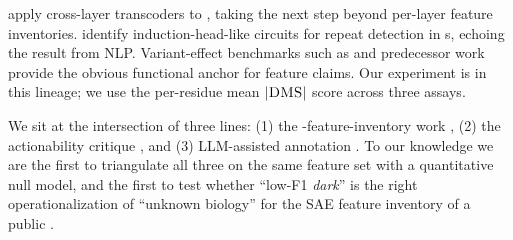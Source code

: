  \citet{circuit2026tracing} apply cross-layer transcoders to \esm, taking the next step beyond per-layer feature inventories. \citet{induction2026biology} identify induction-head-like circuits for repeat detection in \plm{}s, echoing the \citet{olsson2022induction} result from NLP. Variant-effect benchmarks such as \proteingym \citep{notin2023proteingym} and predecessor work \citep{notin2022tranception} provide the obvious functional anchor for \sae feature claims. Our \proteingym experiment is in this lineage; we use the per-residue mean $|\textsc{DMS}|$ score across three assays.

 We sit at the intersection of three lines: (1) the \plm-\sae feature-inventory work \citep{simon2024interplm, adams2025sae, villegas2025steering}, (2) the actionability critique \citep{haque2026antibody, bricken2026actionability}, and (3) LLM-assisted annotation \citep{parsan2025labelling}. To our knowledge we are the first to triangulate all three on the same feature set with a quantitative null model, and the first to test whether ``low-F1 \emph{dark}'' is the right operationalization of ``unknown biology'' for the SAE feature inventory of a public \plm.
